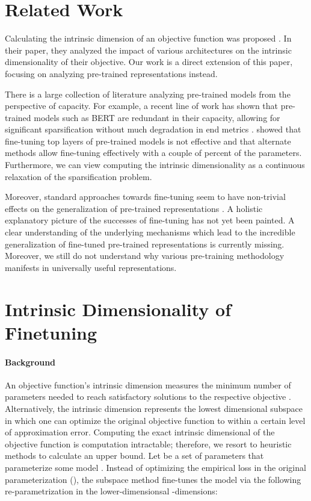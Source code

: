 \documentclass{article} \usepackage{iclr2020_conference,times}
\begin{document}
\section{Related Work}
Calculating the intrinsic dimension of an objective function was proposed \cite{intrinsic_dimension}. In their paper, they analyzed the impact of various architectures on the intrinsic dimensionality of their objective. Our work is a direct extension of this paper, focusing on analyzing pre-trained representations instead.

There is a large collection of literature analyzing pre-trained models from the perspective of capacity. For example, a recent line of work has shown that pre-trained models such as BERT are redundant in their capacity, allowing for significant sparsification without much degradation in end metrics \citep{bert_lottery_ticket, bert_lottery_all_winners, hongyuan_lotter_ticket}. \cite{adapter_network} showed that fine-tuning top layers of pre-trained models is not effective and that alternate methods allow fine-tuning effectively with a couple of percent of the parameters. Furthermore, we can view computing the intrinsic dimensionality as a continuous relaxation of the sparsification problem.

Moreover, standard approaches towards fine-tuning seem to have non-trivial effects on the generalization of pre-trained representations \citep{RXF}. A holistic explanatory picture of the successes of fine-tuning has not yet been painted. A clear understanding of the underlying mechanisms which lead to the incredible generalization of fine-tuned pre-trained representations is currently missing. Moreover, we still do not understand why various pre-training methodology manifests in universally useful representations.



\section{Intrinsic Dimensionality of Finetuning}

\paragraph{Background}
An objective function's intrinsic dimension measures the minimum number of parameters needed to reach satisfactory solutions to the respective objective \citep{intrinsic_dimension}. Alternatively, the intrinsic dimension represents the lowest dimensional subspace in which one can optimize the original objective function to within a certain level of approximation error. Computing the exact intrinsic dimensional of the objective function is computation intractable; therefore, we resort to heuristic methods to calculate an upper bound.
Let  be a set of  parameters that parameterize some model . Instead of optimizing the empirical loss in the original parameterization (), the subspace method fine-tunes the model via the following re-parametrization in the lower-dimensionsal -dimensions:
\end{document}

